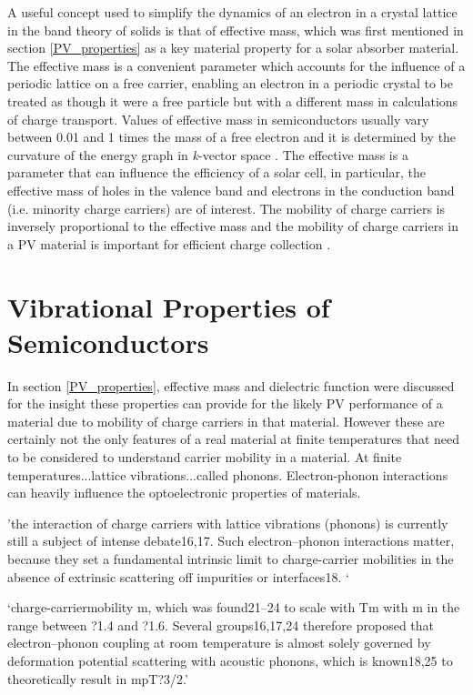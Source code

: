A useful concept used to simplify the dynamics of an electron in a crystal lattice in the band theory of solids is that of effective mass, which was first mentioned in section \ref{PV_properties} as a key material property for a solar absorber material. The effective mass is a convenient parameter which accounts for the influence of a periodic lattice on a free carrier, enabling an electron in a periodic crystal to be treated as though it were a free particle but with a different mass in calculations of charge transport. Values of effective mass in semiconductors usually vary between 0.01 and 1 times the mass of a free electron and it is determined by the curvature of the energy graph in \textit{k}-vector space \cite{small_semiconductor2}. The effective mass is a parameter that can influence the efficiency of a solar cell, in particular, the effective mass of holes in the valence band and electrons in the conduction band (i.e. minority charge carriers) are of interest. The mobility of charge carriers is inversely proportional to the effective mass and the mobility of charge carriers in a PV material is important for efficient charge collection \cite{transport}.
 
 
 \section{Vibrational Properties of Semiconductors}
In section \ref{PV_properties}, effective mass and dielectric function were discussed for the insight these properties can provide for the likely PV performance of a material due to mobility of charge carriers in that material. However these are certainly not the only features of a real material at finite temperatures that need to be considered to understand carrier mobility in a material. At finite temperatures...lattice vibrations...called phonons. Electron-phonon interactions can heavily influence the optoelectronic properties of materials.
 
 'the interaction of charge carriers with lattice vibrations (phonons) is currently still a subject of intense debate16,17. Such electron–phonon interactions matter,
because they set a fundamental intrinsic limit to charge-carrier
mobilities in the absence of extrinsic scattering off impurities or interfaces18. `
 \cite{MAPI_Eg_broadening}
 
`charge-carriermobility m, which was found21–24
to scale with Tm with m in the range between ?1.4 and ?1.6. Several groups16,17,24 therefore proposed that electron–phonon coupling at room temperature is almost solely governed by deformation potential scattering with acoustic phonons, which is known18,25 to theoretically result in mpT?3/2.'
 \cite{MAPI_Eg_broadening}
 
